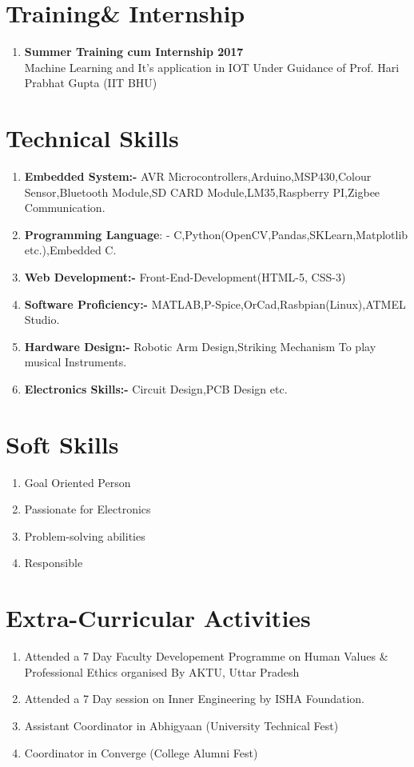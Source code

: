 \documentclass[12pt]{article}
\begin{document}
\section*{\textbf{Training\& Internship}}
\begin{enumerate}
\item
\textbf{Summer Training cum Internship 2017 }\\Machine Learning and It's application in IOT  Under Guidance of Prof. Hari Prabhat Gupta (IIT BHU)
\end{enumerate}

\section*{\textbf{Technical Skills}}
\begin{enumerate}
  \item\textbf{Embedded System:-} AVR Microcontrollers,Arduino,MSP430,Colour Sensor,Bluetooth Module,SD CARD Module,LM35,Raspberry PI,Zigbee Communication.
  \item \textbf{Programming Language}: - C,Python(OpenCV,Pandas,SKLearn,Matplotlib etc.),Embedded C. 
  \item \textbf{ Web Development:-} Front-End-Development(HTML-5, CSS-3)
  \item\textbf{ Software Proficiency:-} MATLAB,P-Spice,OrCad,Rasbpian(Linux),ATMEL Studio.
  \item\textbf{ Hardware Design:-}
  Robotic Arm Design,Striking Mechanism To play musical Instruments.
  \item\textbf{ Electronics Skills:-}
  Circuit Design,PCB Design etc.
\end{enumerate}

\section*{\textbf{Soft Skills}}
\begin{enumerate}
  \item Goal Oriented Person
  \item Passionate for Electronics
  \item Problem-solving abilities
  \item Responsible
  \end{enumerate}
  \section*{\textbf{Extra-Curricular Activities}}
\begin{enumerate}
\item Attended a 7 Day Faculty Developement Programme on Human Values \& Professional Ethics organised By
AKTU, Uttar Pradesh
\item Attended a 7 Day session on Inner Engineering by ISHA Foundation.
\item Assistant Coordinator in Abhigyaan (University Technical Fest)
\item Coordinator in Converge (College Alumni Fest)
\end{enumerate}
\end{document}
